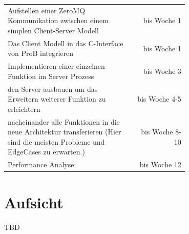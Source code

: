 \documentclass[11pt,a4paper]{scrartcl}
\begin{document}
\begin{table}[!htp]
    \begin{tabular}{p{0.7\linewidth}r}
        Aufstellen einer ZeroMQ Kommunikation zwischen einem simplen Client-Server Modell                                                       & bis Woche 1    \\
        Das Client Modell in das C-Interface von ProB integrieren                                                                               & bis Woche 1    \\
        Implementieren einer einzelnen Funktion im Server Prozess                                                                               & bis Woche 3    \\
        den Server ausbauen um das Erweitern weiterer Funktion zu erleichtern                                                                   & bis Woche 4-5  \\
        nacheinander alle Funktionen in die neue Architektur transferieren \newline (Hier sind die meisten Probleme und EdgeCases zu erwarten.) & bis Woche 8-10 \\
        Performance Analyse:                                                                                                                    & bis Woche 12   \\
    \end{tabular}
\end{table}
\FloatBarrier

\section{Aufsicht}
TBD

\newpage
\printbibliography
\end{document}
